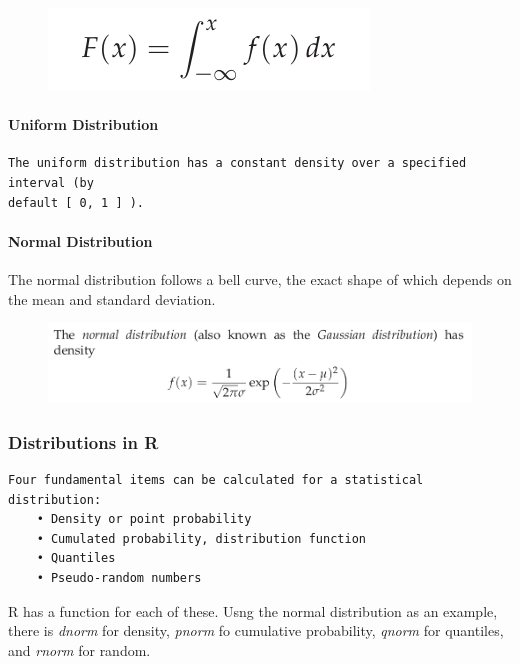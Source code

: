 \documentclass[]{article}
\let\oldparagraph\paragraph
\renewcommand{\paragraph}[1]{\oldparagraph{#1}\mbox{}}
\begin{document}
\begin{figure}
\centering
\includegraphics{img/continous.png}
\caption{}
\end{figure}

\paragraph{Uniform Distribution}\label{uniform-distribution}

\begin{verbatim}
The uniform distribution has a constant density over a specified interval (by
default [ 0, 1 ] ).
\end{verbatim}

\paragraph{Normal Distribution}\label{normal-distribution}

The normal distribution follows a bell curve, the exact shape of which
depends on the mean and standard deviation.

\begin{figure}
\centering
\includegraphics{img/normal.png}
\caption{}
\end{figure}

\subsubsection{Distributions in R}\label{distributions-in-r}

\begin{verbatim}
Four fundamental items can be calculated for a statistical distribution:
    • Density or point probability
    • Cumulated probability, distribution function
    • Quantiles
    • Pseudo-random numbers
\end{verbatim}

R has a function for each of these. Usng the normal distribution as an
example, there is \emph{dnorm} for density, \emph{pnorm} fo cumulative
probability, \emph{qnorm} for quantiles, and \emph{rnorm} for random.
\end{document}
